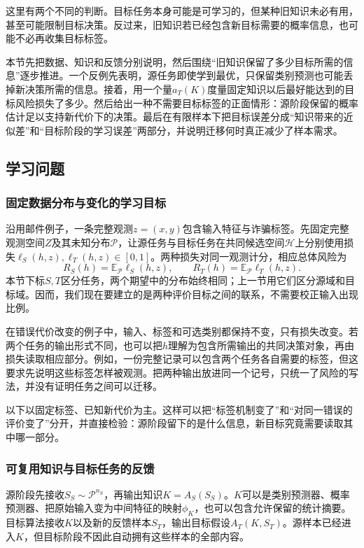 这里有两个不同的判断。目标任务本身可能是可学习的，但某种旧知识未必有用，甚至可能限制目标决策。反过来，旧知识若已经包含新目标需要的概率信息，也可能不必再收集目标标签。

本节先把数据、知识和反馈分别说明，然后围绕“旧知识保留了多少目标所需的信息”逐步推进。一个反例先表明，源任务即使学到最优，只保留类别预测也可能丢掉新决策所需的信息。接着，用一个量$a_T(K)$度量固定知识以后最好能达到的目标风险损失了多少。然后给出一种不需要目标标签的正面情形：源阶段保留的概率估计足以支持新代价下的决策。最后在有限样本下把目标误差分成“知识带来的近似差”和“目标阶段的学习误差”两部分，并说明迁移何时真正减少了样本需求。

\subsection{学习问题}

\subsubsection{固定数据分布与变化的学习目标}

沿用邮件例子，一条完整观测$z=(x,y)$包含输入特征与诈骗标签。先固定完整观测空间$Z$及其未知分布$\mathcal P$，让源任务与目标任务在共同候选空间$\mathcal H$上分别使用损失$\ell_S(h,z),\ell_T(h,z)\in[0,1]$。两种损失对同一观测计分，相应总体风险为
\[
 R_S(h)=\mathbb E_{\mathcal P}\ell_S(h,z),\qquad
 R_T(h)=\mathbb E_{\mathcal P}\ell_T(h,z).
\]
本节下标$S,T$区分任务，两个期望中的分布始终相同；上一节用它们区分源域和目标域。因而，我们现在要建立的是两种评价目标之间的联系，不需要校正输入出现比例。

在错误代价改变的例子中，输入、标签和可选类别都保持不变，只有损失改变。若两个任务的输出形式不同，也可以把$h$理解为包含所需输出的共同决策对象，再由损失读取相应部分。例如，一份完整记录可以包含两个任务各自需要的标签，但这要求先说明这些标签怎样被观测。把两种输出放进同一个记号，只统一了风险的写法，并没有证明任务之间可以迁移。

以下以固定标签、已知新代价为主。这样可以把“标签机制变了”和“对同一错误的评价变了”分开，并直接检验：源阶段留下的是什么信息，新目标究竟需要读取其中哪一部分。

\subsubsection{可复用知识与目标任务的反馈}

源阶段先接收$S_S\sim\mathcal P^{n_S}$，再输出知识$K=A_S(S_S)$。$K$可以是类别预测器、概率预测器、把原始输入变为中间特征的映射$\phi_K$，也可以包含允许保留的统计摘要。目标算法接收$K$以及新的反馈样本$S_T$，输出目标假设$A_T(K,S_T)$。源样本已经进入$K$，但目标阶段不因此自动拥有这些样本的全部内容。

